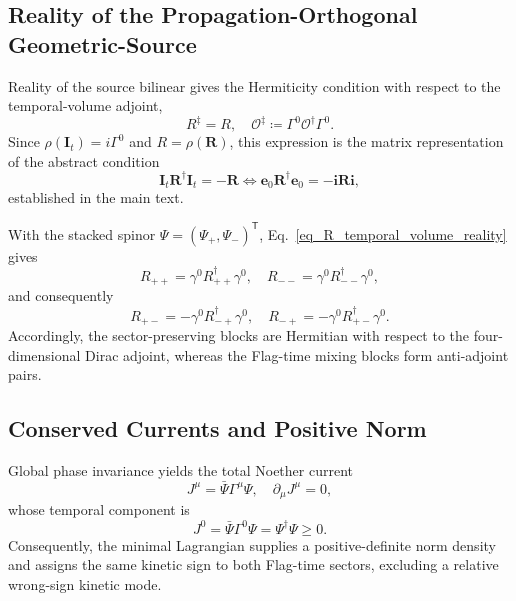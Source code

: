 \subsection{Reality of the Propagation-Orthogonal Geometric-Source}
Reality of the source bilinear gives the Hermiticity condition with respect to the temporal-volume adjoint,
\begin{equation}\label{eq_R_temporal_volume_reality}
    R^{\ddagger} = R, \quad \mathcal{O}^{\ddagger} \coloneqq \Gamma^{0}\mathcal{O}^{\dagger}\Gamma^{0}.
\end{equation}
Since $\rho(\mathbf{I}_{t})=i\Gamma^{0}$ and $R=\rho(\mathbf{R})$, this expression is the matrix representation of the abstract condition
\begin{equation}
    \mathbf{I}_{t}\mathbf{R}^{\dagger}\mathbf{I}_{t} = -\mathbf{R} \Longleftrightarrow \mathbf{e}_{0}\mathbf{R}^{\dagger}\mathbf{e}_{0} = -\mathbf{i}\mathbf{R}\mathbf{i},
\end{equation}
established in the main text.

With the stacked spinor $\Psi=(\Psi_{+},\Psi_{-})^{\mathsf{T}}$, Eq.~\eqref{eq_R_temporal_volume_reality} gives
\begin{equation}
    R_{++} = \gamma^{0}R_{++}^{\dagger}\gamma^{0}, \quad R_{--} = \gamma^{0}R_{--}^{\dagger}\gamma^{0},
\end{equation}
and consequently
\begin{equation}\label{eq_R_off_diagonal_reality}
    R_{+-} = -\gamma^{0}R_{-+}^{\dagger}\gamma^{0}, \quad R_{-+} = -\gamma^{0}R_{+-}^{\dagger}\gamma^{0}.
\end{equation}
Accordingly, the sector-preserving blocks are Hermitian with respect to the four-dimensional Dirac adjoint, whereas the Flag-time mixing blocks form anti-adjoint pairs.

\subsection{Conserved Currents and Positive Norm}
\label{ch_noether_currents}
Global phase invariance yields the total Noether current
\begin{equation}\label{eq_total_current}
    J^{\mu} = \bar{\Psi}\Gamma^{\mu}\Psi, \quad \partial_{\mu}J^{\mu} = 0,
\end{equation}
whose temporal component is
\begin{equation}
    J^{0} = \bar{\Psi}\Gamma^{0}\Psi = \Psi^{\dagger}\Psi \geq 0.
\end{equation}
Consequently, the minimal Lagrangian supplies a positive-definite norm density and assigns the same kinetic sign to both Flag-time sectors, excluding a relative wrong-sign kinetic mode.

